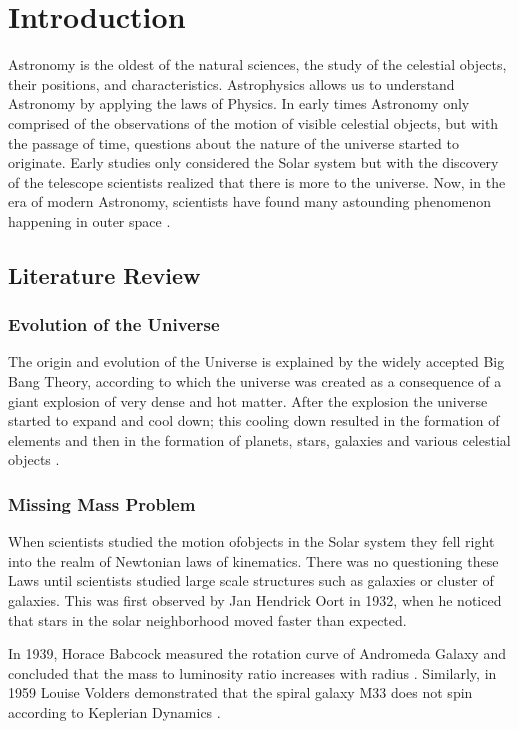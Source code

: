 \chapter{Introduction}

Astronomy is the oldest of the natural sciences, the study of the celestial objects, their positions, and characteristics. Astrophysics allows us to understand Astronomy by applying the laws of Physics. In early times Astronomy only comprised of the observations of the motion of visible celestial objects, but with the passage of time, questions about the nature of the universe started to originate. Early studies only considered the Solar system but with the discovery of the telescope scientists realized that there is more to the universe. Now, in the era of modern Astronomy, scientists have found many astounding phenomenon happening in outer space \cite{introduction}.


\section{Literature Review}

\subsection{Evolution of the Universe}
 The origin and evolution of the Universe is explained by the widely accepted Big Bang Theory, according to which the universe was created as a consequence of a giant explosion of very dense and hot matter. After the explosion the universe started to expand and cool down; this cooling down resulted in the formation of elements and then in the formation of planets, stars, galaxies and various celestial objects \cite{evolution}.

\subsection{Missing Mass Problem}
When scientists studied the motion ofobjects in the Solar system they fell right into the realm of Newtonian laws of kinematics. There was no questioning these Laws until scientists studied large scale structures such as galaxies or cluster of galaxies. This was first observed by Jan Hendrick Oort in 1932, when he noticed that stars in the solar neighborhood moved faster than expected. 

In 1939, Horace Babcock measured the rotation curve of Andromeda Galaxy and concluded that the mass to luminosity ratio increases with radius \cite{missing_mass}. Similarly, in 1959 Louise Volders demonstrated that the spiral galaxy M33 does not spin according to Keplerian Dynamics \cite{mm}.

